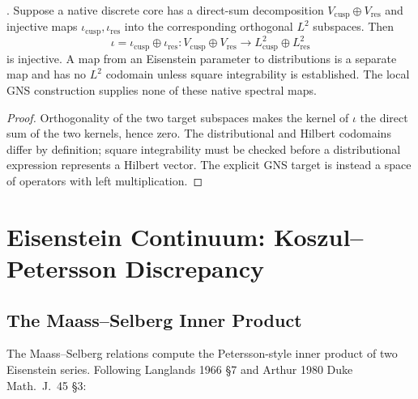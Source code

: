 \begin{proposition}
\label{v4-arith:kms-gns:prop:Vprim-placement}
\ClaimStatusProvedHereConditional. Suppose a native discrete core
has a direct-sum decomposition $V_{\mathrm{cusp}}\oplus V_{\mathrm{res}}$
and injective maps $\iota_{\mathrm{cusp}},\iota_{\mathrm{res}}$
into the corresponding orthogonal $L^2$ subspaces. Then
\begin{equation}
 \iota=\iota_{\mathrm{cusp}}\oplus\iota_{\mathrm{res}}
   :V_{\mathrm{cusp}}\oplus V_{\mathrm{res}}
       \longrightarrow L^2_{\mathrm{cusp}}\oplus L^2_{\mathrm{res}}
 \label{v4-arith:kms-gns:eq:placement}
\end{equation}
is injective. A map from an Eisenstein parameter to distributions
is a separate map and has no $L^2$ codomain unless square
integrability is established. The local GNS construction supplies
none of these native spectral maps.
\end{proposition}
\begin{proof}
Orthogonality of the two target subspaces makes the kernel of
$\iota$ the direct sum of the two kernels, hence zero. The
distributional and Hilbert codomains differ by definition;
square integrability must be checked before a distributional
expression represents a Hilbert vector. The explicit GNS target
is instead a space of operators with left multiplication.
\end{proof}

\section{Eisenstein Continuum: Koszul--Petersson Discrepancy}
\label{v4-arith:kms-gns:cycle4}

\subsection{The Maass--Selberg Inner Product}
\label{v4-arith:kms-gns:cycle4:maass-selberg}

The Maass--Selberg relations compute the Petersson-style inner
product of two Eisenstein series. Following Langlands 1966 \S7 and
Arthur 1980 Duke Math.~J.~45 \S3:

